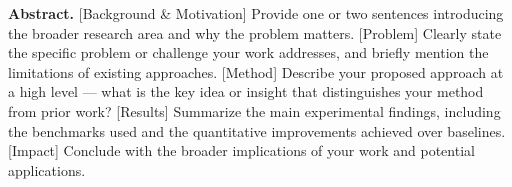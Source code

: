 \textbf{Abstract.}
[Background \& Motivation] Provide one or two sentences introducing the broader research area and why the problem matters.
[Problem] Clearly state the specific problem or challenge your work addresses, and briefly mention the limitations of existing approaches.
[Method] Describe your proposed approach at a high level --- what is the key idea or insight that distinguishes your method from prior work?
[Results] Summarize the main experimental findings, including the benchmarks used and the quantitative improvements achieved over baselines.
[Impact] Conclude with the broader implications of your work and potential applications.
